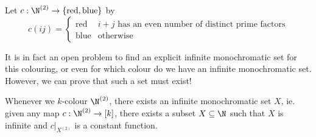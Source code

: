 \documentclass[a4paper]{article}
\begin{document}
\begin{eg}
  Let $c: \N^{(2)} \to \{\mathrm{red}, \mathrm{blue}\}$ by
  \[
    c(ij) =
    \begin{cases}
      \mathrm{red} & i + j\text{ has an even number of distinct prime factors}\\
      \mathrm{blue} & \mathrm{otherwise}
    \end{cases}
  \]
\end{eg}
It is in fact an open problem to find an explicit infinite monochromatic set for this colouring, or even for which colour do we have an infinite monochromatic set. However, we can prove that such a set must exist!

\begin{thm}
  Whenever we $k$-colour $\N^{(2)}$, there exists an infinite monochromatic set $X$, ie. given any map $c: \N^{(2)} \to [k]$, there exists a subset $X \subseteq \N$ such that $X$ is infinite and $c|_{X^{(2)}}$ is a constant function.
\end{thm}
\end{document}
